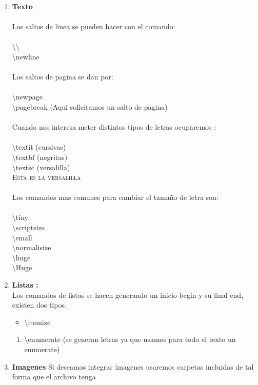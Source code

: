 \documentclass[spanish,12pt,a4paper]{book}%
\begin{document}
\begin{enumerate}
\item\textbf{{Texto}}\\\\
	Los saltos de linea se pueden hacer con el comando:\\\\
	\textbackslash \textbackslash \\
	\textbackslash newline\\
	\\
	Los saltos de pagina se dan por:\\\\
	\textbackslash newpage\\
	\textbackslash pagebreak (Aqui solicitamos un salto de pagina)\\
	\\
	Cuando nos interesa meter distintos tipos de letras ocuparemos :\\
	\\
	\textbackslash textit (cursivas)
	\\
	\textbackslash textbf (negritas)
	\\
	\textbackslash textsc (versalilla)
	\\	
	\textsc{Esta es la versalilla}
	\\
	\\
	\newpage
	Los comandos mas comunes para cambiar el tamaño de letra son:
	\\\\
	\textbackslash tiny\\\textbackslash scriptsize\\\textbackslash small\\ \textbackslash normalisize\\ \textbackslash huge\\ \textbackslash Huge
\item \textbf{Listas :}\\
	Los comandos de listas se hacen generando un inicio begin y su final end, existen dos tipos.
	\begin{itemize}
		\item \textbackslash itemize
	\end{itemize}
	\begin{enumerate}
		\item \textbackslash enumerate (se generan letras ya que usamos para todo el texto un enumerate)
	\end{enumerate}
\item \textbf{Imagenes}
	Si deseamos integrar imagenes usaremos carpetas incluidas de tal forma que el archivo tenga

\end{enumerate}
\end{document}
